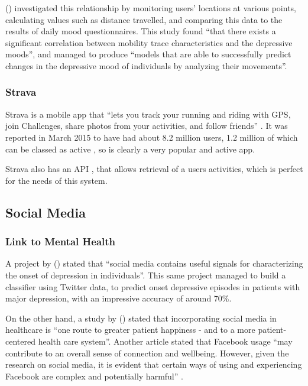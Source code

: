\documentclass[11pt,openright,a4paper]{report}
\begin{document}
\citeauthor{canzian2015trajectories} (\citeyear{canzian2015trajectories}) investigated this relationship by monitoring users' locations at various points, calculating values such as distance travelled, and comparing this data to the results of daily mood questionnaires. This study found \enquote{that there exists a significant correlation between mobility trace characteristics and the depressive moods}, and managed to produce \enquote{models that are able to successfully predict changes in the depressive mood of individuals by analyzing their movements}.

\subsubsection{Strava}
Strava is a mobile app that \enquote{lets you track your running and riding with GPS, join Challenges, share photos from your activities, and follow friends} \parencite{stravamobile}. It was reported in March 2015 to have had about 8.2 million users, 1.2 million of which can be classed as active \parencite{stravausers}, so is clearly a very popular and active app.

Strava also has an API \parencite{stravaapi}, that allows retrieval of a users activities, which is perfect for the needs of this system.

\subsection{Social Media}
\subsubsection{Link to Mental Health}
A project by \citeauthor{de2013predicting} (\citeyear{de2013predicting}) stated that \enquote{social media contains useful signals for characterizing the onset of depression in individuals}. This same project managed to build a classifier using Twitter data, to predict onset depressive episodes in patients with major depression, with an impressive accuracy of around 70\%.

On the other hand, a study by \citeauthor{hawn2009take} (\citeyear{hawn2009take}) stated that incorporating social media in healthcare is \enquote{one route to greater patient happiness - and to a more patient-centered health care system}. Another article stated that Facebook usage \enquote{may contribute to an overall sense of connection and wellbeing. However, given the research on social media, it is evident that certain ways of using and experiencing Facebook are complex and potentially harmful} \parencite{smhurtorhelp}.
\end{document}
